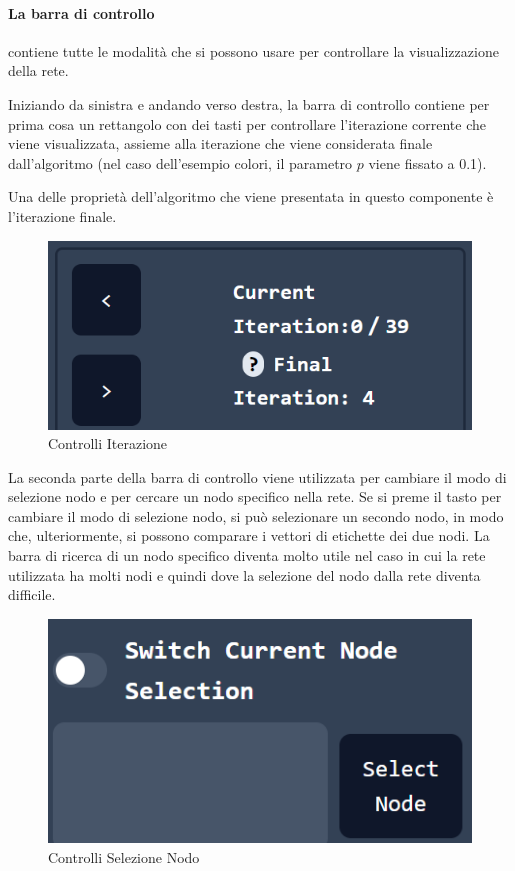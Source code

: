 \documentclass[a4paper,12pt]{report}
\begin{document}
			\paragraph*{La barra di controllo} contiene tutte le modalità che si possono usare per controllare la visualizzazione della rete. 

			Iniziando da sinistra e andando verso destra, la barra di controllo contiene per prima cosa un rettangolo con dei tasti per controllare l'iterazione corrente che viene visualizzata, assieme alla iterazione che viene considerata finale dall'algoritmo (nel caso dell'esempio colori, il parametro $p$ viene fissato a 0.1). 
			
			Una delle proprietà dell'algoritmo che viene presentata in questo componente è l'iterazione finale.
			
			
			\begin{center}
			\begin{figure}[H]
			\centering
			\includegraphics[width=0.8\linewidth,keepaspectratio]{iterationcontrol}
			\caption{Controlli Iterazione}
			\end{figure}
			\end{center}

			La seconda parte della barra di controllo viene utilizzata per cambiare il modo di selezione nodo e per cercare un nodo specifico nella rete. Se si preme il tasto per cambiare il modo di selezione nodo, si può selezionare un secondo nodo, in modo che, ulteriormente, si possono comparare i vettori di etichette dei due nodi. La barra di ricerca di un nodo specifico diventa molto utile nel caso in cui la rete utilizzata ha molti nodi e quindi dove la selezione del nodo dalla rete diventa difficile. 
			
			\begin{center}
			\begin{figure}[H]
			\centering
			\includegraphics[width=0.8\linewidth,keepaspectratio]{nodeselection}
			\caption{Controlli Selezione Nodo}
			\end{figure}
			\end{center}
\end{document}
